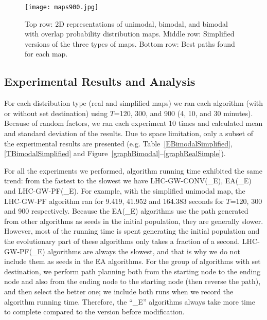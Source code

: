 \documentclass[letterpaper, 10 pt, conference]{ieeeconf}
\begin{document}
\begin{figure}
\centering
\texttt{[image: maps900.jpg]}
\caption{Top row: 2D representations of unimodal, bimodal, and bimodal with overlap probability distribution maps. Middle row: Simplified versions of the three types of maps. Bottom row: Best paths found for each map.}
\label{maps}
\vspace*{-4ex}
\end{figure}


\subsection{Experimental Results and Analysis}

For each distribution type (real and simplified maps) we ran each algorithm (with or without set destination) using $T$=120, 300, and 900 (4, 10, and 30 minutes). Because of random factors, we ran each experiment 10 times and calculated mean and standard deviation of the results. Due to space limitation, only a subset of the experimental results are presented (e.g. Table~\ref{EBimodalSimplified}, \ref{TBimodalSimplified} and Figure~\ref{graphBimodal}--\ref{graphRealSimple}).

For all the experiments we performed, algorithm running time exhibited the same trend: from the fastest to the slowest we have LHC-GW-CONV(\_E), EA(\_E) and LHC-GW-PF(\_E). For example, with the simplified unimodal map, the LHC-GW-PF algorithm ran for 9.419, 41.952 and 164.383 seconds for $T$=120, 300 and 900 respectively. Because the EA(\_E) algorithms use the path generated from other algorithms as seeds in the initial population, they are generally slower. However, most of the running time is spent generating the initial population and the evolutionary part of these algorithms only takes a fraction of a second. LHC-GW-PF(\_E) algorithms are always the slowest, and that is why we do not include them as seeds in the EA algorithms. For the group of algorithms with set destination, we perform path planning both from the starting node to the ending node and also from the ending node to the starting node (then reverse the path), and then select the better one; we include both runs when we record the algorithm running time. Therefore, the ``\_E'' algorithms always take more time to complete compared to the version before modification.
\end{document}
